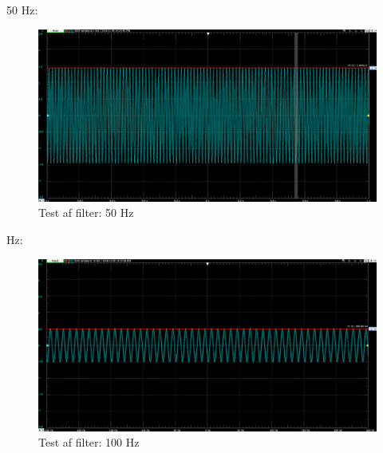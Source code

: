50 Hz: 
\begin{figure}[h!]
	\centering
	\includegraphics[width=1\linewidth]{Hardwaredesign/50hz}
	\caption{Test af filter: 50 Hz}
	\label{fig:50hz}
\end{figure}
 Hz:
\begin{figure}[h!]
	\centering
	\includegraphics[width=1\linewidth]{Hardwaredesign/100hz}
	\caption{Test af filter: 100 Hz}
	\label{fig:100hz}
\end{figure}


